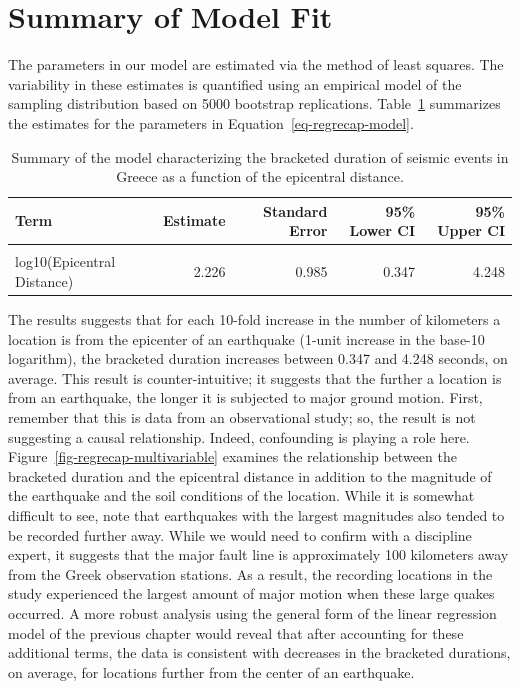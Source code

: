 \documentclass[
  letterpaper,
  DIV=11,
  numbers=noendperiod]{scrreprt}
\theoremstyle{definition}
\theoremstyle{definition}
\theoremstyle{plain}
\theoremstyle{remark}
\begin{document}
\hypertarget{summary-of-model-fit}{%
\section{Summary of Model Fit}\label{summary-of-model-fit}}

The parameters in our model are estimated via the method of least
squares. The variability in these estimates is quantified using an
empirical model of the sampling distribution based on 5000 bootstrap
replications. Table~\ref{tbl-regrecap-model-fit} summarizes the
estimates for the parameters in Equation~\ref{eq-regrecap-model}.

\hypertarget{tbl-regrecap-model-fit}{}
\begin{table}
\caption{\label{tbl-regrecap-model-fit}Summary of the model characterizing the bracketed duration of seismic
events in Greece as a function of the epicentral distance. }\tabularnewline

\centering
\begin{tabular}[t]{lrrrr}
\toprule
Term & Estimate & Standard Error & 95\% Lower CI & 95\% Upper CI\\
\midrule
\cellcolor{gray!6}{(Intercept)} & \cellcolor{gray!6}{2.553} & \cellcolor{gray!6}{1.031} & \cellcolor{gray!6}{0.464} & \cellcolor{gray!6}{4.561}\\
log10(Epicentral Distance) & 2.226 & 0.985 & 0.347 & 4.248\\
\bottomrule
\end{tabular}
\end{table}

The results suggests that for each 10-fold increase in the number of
kilometers a location is from the epicenter of an earthquake (1-unit
increase in the base-10 logarithm), the bracketed duration increases
between 0.347 and 4.248 seconds, on average. This result is
counter-intuitive; it suggests that the further a location is from an
earthquake, the longer it is subjected to major ground motion. First,
remember that this is data from an observational study; so, the result
is not suggesting a causal relationship. Indeed, confounding is playing
a role here. Figure~\ref{fig-regrecap-multivariable} examines the
relationship between the bracketed duration and the epicentral distance
in addition to the magnitude of the earthquake and the soil conditions
of the location. While it is somewhat difficult to see, note that
earthquakes with the largest magnitudes also tended to be recorded
further away. While we would need to confirm with a discipline expert,
it suggests that the major fault line is approximately 100 kilometers
away from the Greek observation stations. As a result, the recording
locations in the study experienced the largest amount of major motion
when these large quakes occurred. A more robust analysis using the
general form of the linear regression model of the previous chapter
would reveal that after accounting for these additional terms, the data
is consistent with decreases in the bracketed durations, on average, for
locations further from the center of an earthquake.
\end{document}
